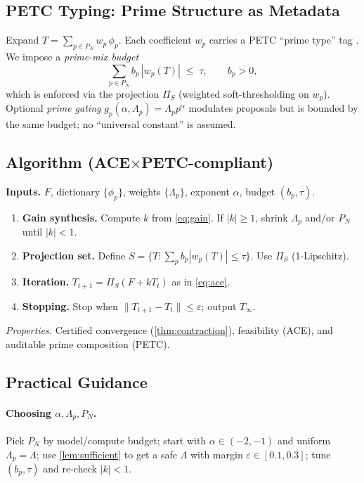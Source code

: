 \documentclass[11pt]{article}
\theoremstyle{definition}
\theoremstyle{remark}
\newcommand{\1}{\mathbf{1}}
\begin{document}
\subsection{PETC Typing: Prime Structure as Metadata}
Expand $T=\sum_{p\in P_N} w_p\,\phi_p$. Each coefficient $w_p$ carries a PETC ``prime type'' tag \cite{VanGelderPETC}. We impose a \emph{prime-mix budget}
\begin{equation}
  \sum_{p\in P_N} b_p\,|w_p(T)| \;\le\; \tau,\qquad b_p>0,
  \label{eq:budget}
\end{equation}
which is enforced via the projection $\Pi_S$ (weighted soft-thresholding on $w_p$). Optional \emph{prime gating} $g_p(\alpha,\Lambda_p)=\Lambda_p p^{\alpha}$ modulates proposals but is bounded by the same budget; no ``universal constant'' is assumed.

\subsection{Algorithm (ACE$\times$PETC-compliant)}
\noindent\textbf{Inputs.} $F$, dictionary $\{\phi_p\}$, weights $\{\Lambda_p\}$, exponent $\alpha$, budget $(b_p,\tau)$.

\begin{enumerate}[leftmargin=2em,label=\arabic*.]
  \item \textbf{Gain synthesis.} Compute $k$ from \cref{eq:gain}. If $|k|\ge 1$, shrink $\Lambda_p$ and/or $P_N$ until $|k|<1$.
  \item \textbf{Projection set.} Define $S=\{T:\sum_p b_p|w_p(T)|\le \tau\}$. Use $\Pi_S$ (1-Lipschitz).
  \item \textbf{Iteration.} $T_{t+1}=\Pi_S(F+kT_t)$ as in \cref{eq:ace}.
  \item \textbf{Stopping.} Stop when $\|T_{t+1}-T_t\|\le\varepsilon$; output $T_\infty$.
\end{enumerate}
\noindent\emph{Properties.} Certified convergence (\cref{thm:contraction}), feasibility (ACE), and auditable prime composition (PETC).

\subsection{Practical Guidance}
\paragraph{Choosing $\alpha,\Lambda_p,P_N$.} Pick $P_N$ by model/compute budget; start with $\alpha\in(-2,-1)$ and uniform $\Lambda_p=\Lambda$; use \cref{lem:sufficient} to get a safe $\Lambda$ with margin $\varepsilon\in[0.1,0.3]$; tune $(b_p,\tau)$ and re-check $|k|<1$.
\end{document}
